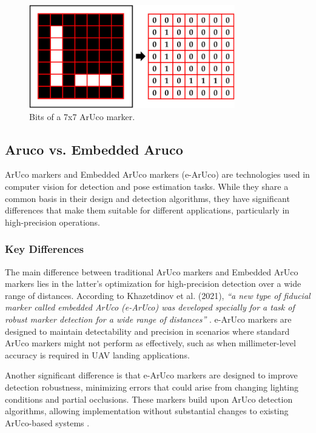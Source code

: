     \begin{figure}[h!] 
    \centering 
    \includegraphics[width=0.8\textwidth]{pictures/bits_aruco.png} %
    \caption{Bits of a 7x7 ArUco marker.} 
    \label{fig} 
    \end{figure}

\subsection{Aruco vs. Embedded Aruco}

    ArUco markers and Embedded ArUco markers (e-ArUco) are technologies used in computer vision for detection and pose estimation tasks. While they share a common basis in their design and detection algorithms, they have significant differences that make them suitable for different applications, particularly in high-precision operations.

    \subsubsection{Key Differences}

    The main difference between traditional ArUco markers and Embedded ArUco markers lies in the latter's optimization for high-precision detection over a wide range of distances. According to Khazetdinov et al. (2021), \textit{“a new type of fiducial marker called embedded ArUco (e-ArUco) was developed specially for a task of robust marker detection for a wide range of distances”} \cite{khazetdinov2021}. e-ArUco markers are designed to maintain detectability and precision in scenarios where standard ArUco markers might not perform as effectively, such as when millimeter-level accuracy is required in UAV landing applications.

    Another significant difference is that e-ArUco markers are designed to improve detection robustness, minimizing errors that could arise from changing lighting conditions and partial occlusions. These markers build upon ArUco detection algorithms, allowing implementation without substantial changes to existing ArUco-based systems \cite{khazetdinov2021}.


